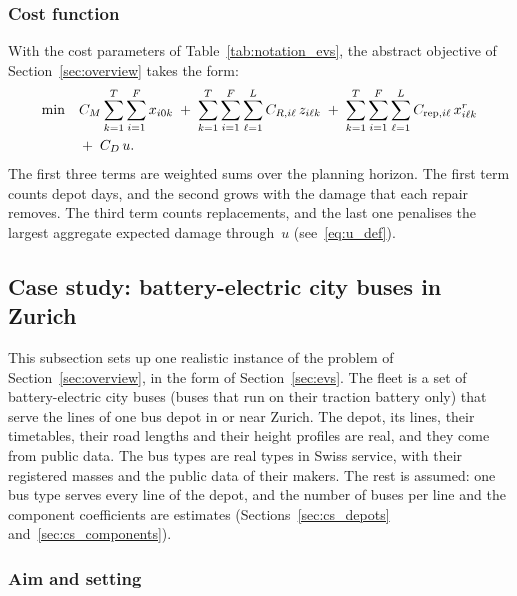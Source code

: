 \documentclass[11pt,a4paper]{article}
\theoremstyle{plain}
\theoremstyle{definition}
\theoremstyle{remark}
\begin{document}
\subsubsection{Cost function}

With the cost parameters of Table~\ref{tab:notation_evs}, the abstract objective of Section~\ref{sec:overview} takes the form:
\begin{align}\label{eq:objective_evs}
\min \quad
  & C_M \sum_{k=1}^{T} \sum_{i=1}^{F} x_{i0k}
  \;+\; \sum_{k=1}^{T} \sum_{i=1}^{F} \sum_{\ell=1}^{L} C_{R,i\ell}\, z_{i\ell k}
  \;+\; \sum_{k=1}^{T} \sum_{i=1}^{F} \sum_{\ell=1}^{L} C_{\mathrm{rep},i\ell}\, x^r_{i\ell k} \notag \\
  & +\; C_D\, u.
\end{align}
The first three terms are weighted sums over the planning horizon.
The first term counts depot days, and the second grows with the damage that each repair removes.
The third term counts replacements, and the last one penalises the largest aggregate expected damage through~$u$ (see~\eqref{eq:u_def}).

\subsection{Case study: battery-electric city buses in Zurich}
\label{sec:case_study}

This subsection sets up one realistic instance of the problem of Section~\ref{sec:overview}, in the form of Section~\ref{sec:evs}.
The fleet is a set of battery-electric city buses (buses that run on their traction battery only) that serve the lines of one bus depot in or near Zurich.
The depot, its lines, their timetables, their road lengths and their height profiles are real, and they come from public data.
The bus types are real types in Swiss service, with their registered masses and the public data of their makers.
The rest is assumed: one bus type serves every line of the depot, and the number of buses per line and the component coefficients are estimates (Sections~\ref{sec:cs_depots} and~\ref{sec:cs_components}).

\subsubsection{Aim and setting}\label{sec:cs_aim}
\end{document}
